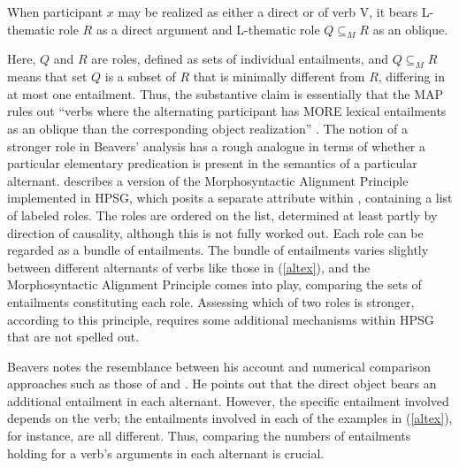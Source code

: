 \documentclass[output=paper
                ,modfonts
                ,nonflat
	        ,collection
	        ,collectionchapter
	        ,collectiontoclongg
 	        ,biblatex
                ,babelshorthands
                ,newtxmath
                ,draftmode
                ,colorlinks, citecolor=brown
]{./langsci/langscibook}
\begin{document}
\begin{exe}
\ex\label{beavers-map}
When participant $x$ may be realized as either a direct or  of verb V, it bears L-thematic role $R$ as a direct argument and L-thematic role $Q\subseteq_{M}R$ as an oblique.
\citep[848]{Beavers2010}
\end {exe}

\noindent
Here, $Q$ and $R$ are roles, defined as sets of individual entailments, and  $Q\subseteq_{M}R$ means that set $Q$ is a subset of $R$ that is minimally different from $R$, differing in at most one entailment.
Thus, the substantive claim is essentially that the MAP rules out ``verbs where the alternating participant has \textsc{MORE} lexical entailments as an oblique than the corresponding object realization'' \citep[849]{Beavers2010}.
The notion of a stronger role in Beavers' analysis has a rough analogue in terms of whether a particular elementary predication is present in the semantics of a particular alternant.
\citet{Beavers2005} describes a version of the Morphosyntactic Alignment Principle implemented in HPSG, which posits a separate  attribute within , containing a list of labeled roles.
The roles are ordered on the  list, determined at least partly by direction of causality, although this is not fully worked out.
Each role can be regarded as a bundle of entailments.
The bundle of entailments varies slightly between different alternants of verbs like those in (\ref{altex}), and the Morphosyntactic Alignment Principle comes into play, comparing the sets of entailments constituting each role.
Assessing which of two roles is stronger, according to this principle, requires some additional mechanisms within HPSG that are not spelled out.

Beavers notes the resemblance between his account and numerical comparison approaches such as those of \citet{Dowty1991} and \citet{AckermanandMoore2001}.
He points out that the direct object bears an additional entailment in each alternant. However, the specific entailment involved depends on the verb; the entailments involved in each of the examples in (\ref{altex}), for instance, are all different.  Thus, comparing the numbers of entailments holding for a verb's arguments in each alternant is crucial.
\end{document}

